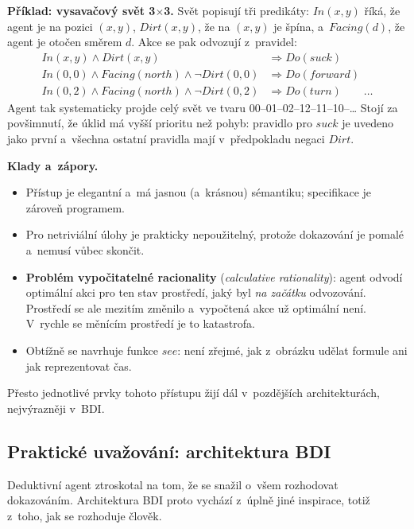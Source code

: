 \documentclass[11pt,a4paper]{article}
\theoremstyle{definition}
\begin{document}
\medskip
\noindent\textbf{Příklad: vysavačový svět 3$\times$3.}
Svět popisují tři predikáty: $\mathit{In}(x,y)$ říká, že agent je na pozici $(x,y)$,
$\mathit{Dirt}(x,y)$, že na $(x,y)$ je špína, a~$\mathit{Facing}(d)$, že agent je otočen směrem
$d$. Akce se pak odvozují z~pravidel:
\begin{align*}
\mathit{In}(x,y) \wedge \mathit{Dirt}(x,y) &\Rightarrow \mathit{Do}(\mathit{suck}) \\
\mathit{In}(0,0) \wedge \mathit{Facing}(\mathit{north}) \wedge \neg\mathit{Dirt}(0,0)
  &\Rightarrow \mathit{Do}(\mathit{forward}) \\
\mathit{In}(0,2) \wedge \mathit{Facing}(\mathit{north}) \wedge \neg\mathit{Dirt}(0,2)
  &\Rightarrow \mathit{Do}(\mathit{turn}) \qquad \dots
\end{align*}
Agent tak systematicky projde celý svět ve tvaru  00--01--02--12--11--10--\dots
Stojí za povšimnutí, že úklid má vyšší prioritu než pohyb: pravidlo pro $\mathit{suck}$ je
uvedeno jako první a~všechna ostatní pravidla mají v~předpokladu negaci $\mathit{Dirt}$.

\medskip
\noindent\textbf{Klady a~zápory.}
\begin{itemize}
\item[$+$] Přístup je elegantní a~má jasnou (a~krásnou) sémantiku; specifikace je zároveň programem.
\item[$-$] Pro netriviální úlohy je prakticky nepoužitelný, protože dokazování je pomalé a~nemusí
  vůbec skončit.
\item[$-$] \textbf{Problém vypočitatelné racionality} (\emph{calculative rationality}): agent
  odvodí optimální akci pro ten stav prostředí, jaký byl \emph{na začátku} odvozování. Prostředí
  se ale mezitím změnilo a~vypočtená akce už optimální není. V~rychle se měnícím prostředí je to
  katastrofa.
\item[$-$] Obtížně se navrhuje funkce $\mathit{see}$: není zřejmé, jak z~obrázku udělat formule
  ani jak reprezentovat čas.
\end{itemize}
Přesto jednotlivé prvky tohoto přístupu žijí dál v~pozdějších architekturách, nejvýrazněji v~BDI.

\subsection{Praktické uvažování: architektura BDI}

Deduktivní agent ztroskotal na tom, že se snažil o~všem rozhodovat dokazováním. Architektura BDI
proto vychází z~úplně jiné inspirace, totiž z~toho, jak se rozhoduje člověk.
\end{document}
